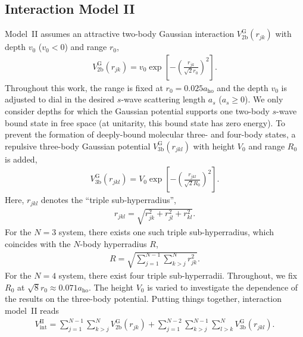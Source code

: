 \documentclass[aps,pra,twocolumn,showpacs,superscriptaddress]{revtex4}
\begin{document}
\subsection{Interaction Model II}
Model~II assumes an attractive two-body Gaussian 
interaction
$V_{\text{2b}}^{\text{G}}(r_{jk})$ with depth $v_0$ ($v_0 < 0$) and
range $r_0$,
\begin{eqnarray}
V_{\text{2b}}^{\text{G}}(r_{jk}) = v_0 \exp \left[ - \left(
\frac{r_{jk}}{\sqrt{2} r_0} \right) ^2
\right].
\end{eqnarray}
Throughout this 
work,
the range is fixed at $r_0=0.025 a_{\text{ho}}$ and the depth $v_0$
is adjusted to dial in the desired
$s$-wave scattering length $a_s$
($a_s \ge 0$).
We only consider depths for which
the Gaussian potential supports
one two-body $s$-wave bound state in
free space (at unitarity, this
bound state has zero energy).
To prevent the formation of deeply-bound molecular 
three- and four-body states,
a repulsive three-body Gaussian potential
$V_{\text{3b}}^{\text{G}}(r_{jkl})$ with height $V_0$ and range $R_0$ is added,
\begin{eqnarray}
V_{\text{3b}}^{\text{G}}(r_{jkl}) = V_0 \exp \left[ - \left(
\frac{r_{jkl}}{\sqrt{2} R_0} \right) ^2 \right]
.
\end{eqnarray}
Here, $r_{jkl}$ denotes the ``triple sub-hyperradius'',
\begin{eqnarray}
r_{jkl} = \sqrt{ r_{jk}^2 + r_{jl}^2 + r_{kl}^2 
}.
\end{eqnarray}
For the $N=3$ system, there exists one such triple sub-hyperradius, which
coincides
with the $N$-body hyperradius $R$,
\begin{eqnarray}
R =  \sqrt{ \sum_{j=1}^{N-1} \sum_{k>j}^N r_{jk}^2}.
\end{eqnarray}
For the $N=4$ system, there exist four triple sub-hyperradii.
Throughout, we fix $R_0$ at $\sqrt{8} r_0 \approx 0.071 a_{\text{ho}}$.
The height $V_0$ is varied to investigate the dependence of the
results on the three-body potential.
Putting things together, interaction model~II reads
\begin{eqnarray}
V_{\text{int}}^{\text{II}}=
\sum_{j=1}^{N-1} \sum_{k>j}^N V_{\text{2b}}^{\text{G}}(r_{jk})+
\sum_{j=1}^{N-2} \sum_{k>j}^{N-1} \sum_{l>k}^N 
V_{\text{3b}}^{\text{G}}(r_{jkl}).
\end{eqnarray}
\end{document}
